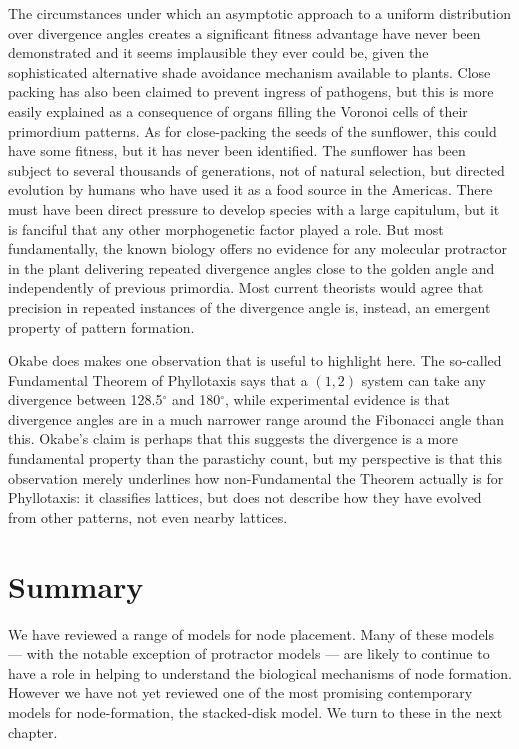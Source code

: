 The circumstances under which an asymptotic approach to a uniform distribution over divergence angles creates a significant fitness advantage have never been demonstrated and it seems implausible they ever could be, given the sophisticated alternative shade avoidance mechanism available to plants. Close packing has also been claimed to prevent ingress of pathogens, but this is more easily explained as a consequence of organs filling the Voronoi cells of their primordium patterns. As for close-packing the seeds of the sunflower, this could have some fitness, but it has never been identified. The sunflower has been subject to several thousands of generations, not of natural selection, but directed evolution by humans who have used it as a food source in the Americas. There must have been direct pressure to develop species with a large capitulum, but it is fanciful that any other morphogenetic factor played a role. 
But most fundamentally, the known biology offers no evidence for any molecular protractor in the plant delivering repeated divergence angles close to the golden angle and independently of previous primordia. Most current theorists would agree that precision in repeated instances of the divergence angle is, instead, an emergent property of pattern formation. 

Okabe does makes one observation that is useful to highlight here. The so-called Fundamental Theorem of Phyllotaxis says that a $(1,2)$ system can take any divergence between 128.5$^\circ$ and 180$^\circ$, while experimental evidence is that divergence angles are in a much narrower range around the Fibonacci angle than this. Okabe's claim is perhaps that this suggests the divergence is a more fundamental property than the parastichy count, but my perspective is that this observation merely underlines how non-Fundamental the Theorem actually is for Phyllotaxis: it classifies lattices, but does not describe how they have evolved from other patterns, not even nearby lattices.

\section{Summary}
We have reviewed a range of models for node placement. Many of these models --- with the notable exception of protractor models --- are likely to continue to have a role in helping to understand the biological mechanisms of node formation. However we have not yet reviewed one of the most promising contemporary models for node-formation, the stacked-disk model. We turn to these in the next chapter.

